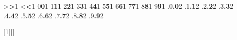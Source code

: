 {{      {>}{{{\color{red}\bfseries>}}}1%
      {<}{{{\color{red}\bfseries<}}}1%
      {0}{{{\color{purple}\bfseries0}}}1%
      {1}{{{\color{purple}\bfseries1}}}1%
      {2}{{{\color{purple}\bfseries2}}}1%
      {3}{{{\color{purple}\bfseries3}}}1%
      {4}{{{\color{purple}\bfseries4}}}1%
      {5}{{{\color{purple}\bfseries5}}}1%
      {6}{{{\color{purple}\bfseries6}}}1%
      {7}{{{\color{purple}\bfseries7}}}1%
      {8}{{{\color{purple}\bfseries8}}}1%
      {9}{{{\color{purple}\bfseries9}}}1%
      {.0}{{{\color{purple}\bfseries.0}}}2%
      {.1}{{{\color{purple}\bfseries.1}}}2%
      {.2}{{{\color{purple}\bfseries.2}}}2%
      {.3}{{{\color{purple}\bfseries.3}}}2%
      {.4}{{{\color{purple}\bfseries.4}}}2%
      {.5}{{{\color{purple}\bfseries.5}}}2%
      {.6}{{{\color{purple}\bfseries.6}}}2%
      {.7}{{{\color{purple}\bfseries.7}}}2%
      {.8}{{{\color{purple}\bfseries.8}}}2%
      {.9}{{{\color{purple}\bfseries.9}}}2%
  }
}

[1][]{
  \pythonstyle{
    \lstset{#1}
  }
}{}

\newcommand\pyfile[2][]{
  \pythonstyle{
    
  }
}

\newcommand\python[1]{
  \pythonstyle{
    \lstinline!#1!
  }
}
